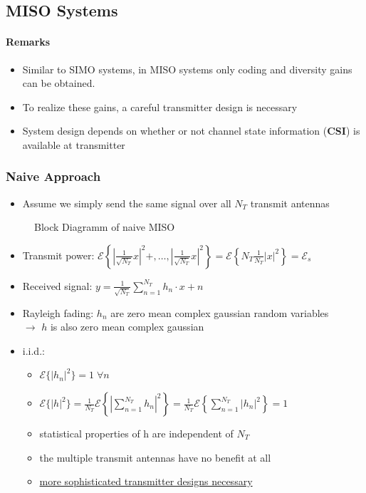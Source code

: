 \documentclass[a4paper, 10pt]{article}
\begin{document}
\subsection{MISO Systems}
\paragraph{Remarks}
	\begin{itemize}
		\item Similar to SIMO systems, in MISO systems only coding and diversity gains can be obtained.
		\item To realize these gains, a careful transmitter design is necessary
		\item System design depends on whether or not channel state information (\textbf{CSI}) is available at transmitter
	\end{itemize}
\subsubsection{Naive Approach}
\begin{itemize}	
	\item Assume we simply send the same signal over all $N_T$ transmit antennas
\end{itemize}
\begin{figure}[ht]
	\centering
	
	\caption{Block Diagramm of naive MISO}
	\label{fig:MISO_NAIVE.pstex_t}
\end{figure}

\begin{itemize}
	\item Transmit power: $\mathcal{E}\left\{\left|\frac{1}{\sqrt{N_T}}x\right|^2+,\dots,\left|\frac{1}{\sqrt{N_T}}x\right|^2\right\}=\mathcal{E}\left\{N_T\frac{1}{N_T}|x|^2\right\}=\mathcal{E}_s$
	\item Received signal: $y=\frac{1}{\sqrt{N_T}}\sum\limits_{n=1}^{N_T}h_n\cdot x+n$
	\item Rayleigh fading: $h_n$ are zero mean complex gaussian random variables\\
	$\rightarrow$ $h$ is also zero mean complex gaussian
	\item i.i.d.:
	\begin{itemize}
		\item $\mathcal{E}\{|h_n|^2\}=1\;\forall n$
		\item $\mathcal{E}\{|h|^2\}=\frac{1}{N_T}\mathcal{E}\left\{\left|\sum\limits_{n=1}^{N_T}h_n\right|^2\right\}=\frac{1}{N_T}\mathcal{E}\left\{\sum\limits^{N_T}_{n=1}|h_n|^2\right\}=1$
		\item statistical properties of h are independent of $N_T$
		\item the multiple transmit antennas have no benefit at all
		\item \underline{more sophisticated transmitter designs necessary}
	\end{itemize}
\end{itemize}
\end{document}
